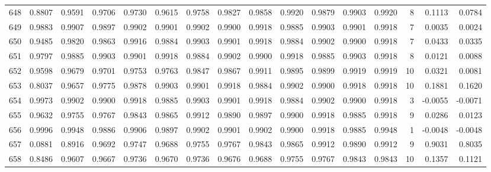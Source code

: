 \begin{tabular}{lrrrrrrrrrrrrrrr}
648 &      0.8807 &  0.9591 &  0.9706 &  0.9730 &  0.9615 &  0.9758 &  0.9827 &  0.9858 &  0.9920 &  0.9879 &   0.9903 &     0.9920 &      8 &                    0.1113 &                     0.0784 \\
649 &      0.9883 &  0.9907 &  0.9897 &  0.9902 &  0.9901 &  0.9902 &  0.9900 &  0.9918 &  0.9885 &  0.9903 &   0.9901 &     0.9918 &      7 &                    0.0035 &                     0.0024 \\
650 &      0.9485 &  0.9820 &  0.9863 &  0.9916 &  0.9884 &  0.9903 &  0.9901 &  0.9918 &  0.9884 &  0.9902 &   0.9900 &     0.9918 &      7 &                    0.0433 &                     0.0335 \\
651 &      0.9797 &  0.9885 &  0.9903 &  0.9901 &  0.9918 &  0.9884 &  0.9902 &  0.9900 &  0.9918 &  0.9885 &   0.9903 &     0.9918 &      8 &                    0.0121 &                     0.0088 \\
652 &      0.9598 &  0.9679 &  0.9701 &  0.9753 &  0.9763 &  0.9847 &  0.9867 &  0.9911 &  0.9895 &  0.9899 &   0.9919 &     0.9919 &     10 &                    0.0321 &                     0.0081 \\
653 &      0.8037 &  0.9657 &  0.9775 &  0.9878 &  0.9903 &  0.9901 &  0.9918 &  0.9884 &  0.9902 &  0.9900 &   0.9918 &     0.9918 &     10 &                    0.1881 &                     0.1620 \\
654 &      0.9973 &  0.9902 &  0.9900 &  0.9918 &  0.9885 &  0.9903 &  0.9901 &  0.9918 &  0.9884 &  0.9902 &   0.9900 &     0.9918 &      3 &                   -0.0055 &                    -0.0071 \\
655 &      0.9632 &  0.9755 &  0.9767 &  0.9843 &  0.9865 &  0.9912 &  0.9890 &  0.9897 &  0.9900 &  0.9918 &   0.9885 &     0.9918 &      9 &                    0.0286 &                     0.0123 \\
656 &      0.9996 &  0.9948 &  0.9886 &  0.9906 &  0.9897 &  0.9902 &  0.9901 &  0.9902 &  0.9900 &  0.9918 &   0.9885 &     0.9948 &      1 &                   -0.0048 &                    -0.0048 \\
657 &      0.0881 &  0.8916 &  0.9692 &  0.9747 &  0.9688 &  0.9755 &  0.9767 &  0.9843 &  0.9865 &  0.9912 &   0.9890 &     0.9912 &      9 &                    0.9031 &                     0.8035 \\
658 &      0.8486 &  0.9607 &  0.9667 &  0.9736 &  0.9670 &  0.9736 &  0.9676 &  0.9688 &  0.9755 &  0.9767 &   0.9843 &     0.9843 &     10 &                    0.1357 &                     0.1121 \\

\end{tabular}
